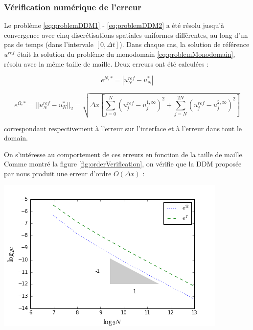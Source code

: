 \subsubsection{Vérification numérique de l'erreur}

\indent Le problème \eqref{eq:problemDDM1} - \eqref{eq:problemDDM2} a été résolu jusqu'à convergence avec cinq discrétisations spatiales uniformes différentes, au long d'un pas de temps (dans l'intervale $[0,\Delta t]$). Dans chaque cas, la solution de référence $u^{ref}$ était la solution du problème du monodomain \eqref{eq:problemMonodomain}, résolu avec la même taille de maille. Deux erreurs ont été calculées :

\begin{equation*}
	e^{N,*} = |u^{ref}_N - u^{*}_N|
\end{equation*}

\begin{equation}
	\label{eq:errorDDM}
	e^{\Omega,*} = ||u^{ref}_N - u^{*}_N||_2 = \sqrt{\Delta x \left[ \sum_{j=0}^N{(u^{ref}_j - u^{1,\infty}_j)^2 } + \sum_{j=N}^{2N}{(u^{ref}_j - u^{2,\infty}_j)^2 } \right] }
\end{equation}

\noindent correspondant respectivement à l'erreur sur l'interface et à l'erreur dans tout le domain.

\indent On s'intéresse au comportement de ces erreurs en fonction de la taille de maille. Comme montré la figure \ref{fig:orderVerification}, on vérifie que la DDM proposée par nous produit une erreur d'ordre $O(\Delta x)$  :

\begingroup
\begin{center}
	\includegraphics[scale=.5]{figures/convergenceVerificationCorrectN.png}
\end{center}
\endgroup

